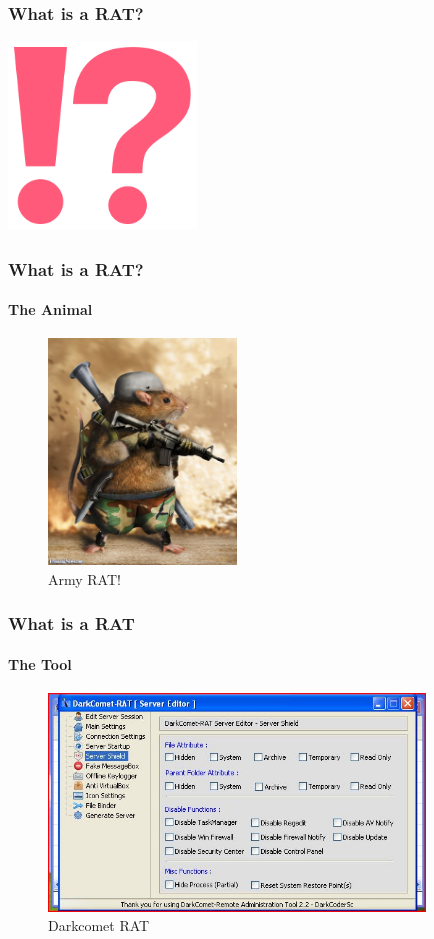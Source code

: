 \documentclass[aspectratio=169]{beamer}
\begin{document}
\begin{frame}
  \frametitle{What is a RAT?}
  \begin{center}
    \includegraphics[width=5cm,keepaspectratio]{question_mark}
  \end{center}
\end{frame}

\begin{frame}
  \frametitle{What is a RAT?}
  \framesubtitle{The Animal}
  \begin{center}
    \begin{figure}
      \includegraphics[width=5cm,keepaspectratio]{rat_animal}
      \caption{Army RAT!}
    \end{figure}
  \end{center}
\end{frame}

\begin{frame}
  \frametitle{What is a RAT}
  \framesubtitle{The Tool}
  \begin{center}
    \begin{figure}
      \includegraphics[width=10cm,keepaspectratio]{darkcomet_rat}
      \caption{Darkcomet RAT}
    \end{figure}
  \end{center}
\end{frame}
\end{document}
